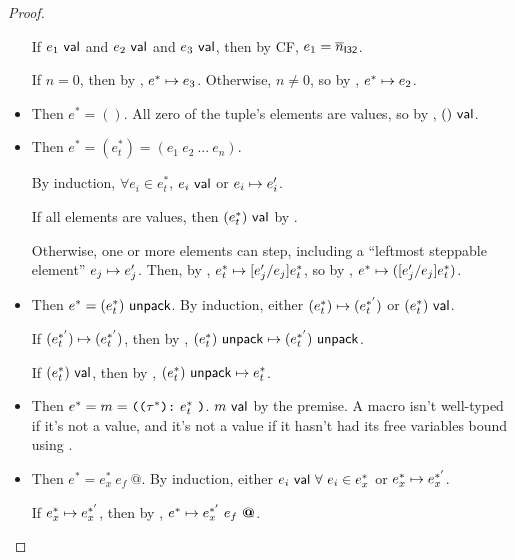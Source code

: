 \documentclass[acmsmall, review]{acmart}
\theoremstyle{definition}
\begin{document}
\begin{proof}
\begin{itemize}
            If $e_1 ~\mathsf{val}$ and $e_2 ~\mathsf{val}$ and $e_3 ~\mathsf{val}$, then by CF, $e_1 = \overline{n}_{\mathsf{I32}}$.
            
            If $n = 0$, then by , $e^* \mapsto e_3$.
            Otherwise, $n \neq 0$, so by , $e^* \mapsto e_2$.
        
        \item {}
            Then $e^* = ()$. All zero of the tuple's elements are values, so by , $() ~\mathsf{val}$.
        
        \item {}
            Then $e^* = (e^*_t) = (e_1~ e_2~ ...~ e_n)$.
            
            By induction, $\forall e_i \in e^*_t$, $e_i ~\mathsf{val}$ or $e_i \mapsto e_i'$.
            
            If all elements are values, then $(e^*_t) ~\mathsf{val}$ by .
            
            Otherwise, one or more elements can step, including a ``leftmost steppable element'' $e_j \mapsto e_j'$.
            Then, by , $e^*_t \mapsto [e_j' / e_j] e^*_t$, so by , $e^* \mapsto ([e_j' / e_j] e^*_t)$.
            
        \item {}
            Then $e^* = (e^*_t) ~ \mathsf{unpack}$.
            By induction, either $(e^*_t) \mapsto (e^{*'}_t)$ or $(e^*_t) ~\mathsf{val}$.
            
            If $(e^{*'}_t) \mapsto (e^{*'}_t)$, then by , $(e^*_t) ~ \mathsf{unpack} \mapsto (e^{*'}_t) ~ \mathsf{unpack}$.
            
            If $(e^*_t) ~\mathsf{val}$, then by , $(e^*_t) ~ \mathsf{unpack} \mapsto e^*_t$.
        
        \item {}
            Then $e^* = m = \texttt{((} \tau^* \texttt{):} ~ e^*_t ~ \texttt{)}$. $m ~\mathsf{val}$ by the premise. A macro isn't well-typed if it's not a value, and it's not a value if it hasn't had its free variables bound using .
        
        \item {}
            Then $e^* = e^*_x~ e_f~ \textbf{@}$. By induction, either $e_i ~\mathsf{val}~ \forall~ e_i \in e^*_x$ or $e^*_x \mapsto e^{*'}_x$.
            
            If $e^*_x \mapsto e^{*'}_x$, then by , $e^* \mapsto e^{*'}_x~ e_f~ \textbf{@}$.
            

\end{itemize}
\end{proof}
\end{document}
